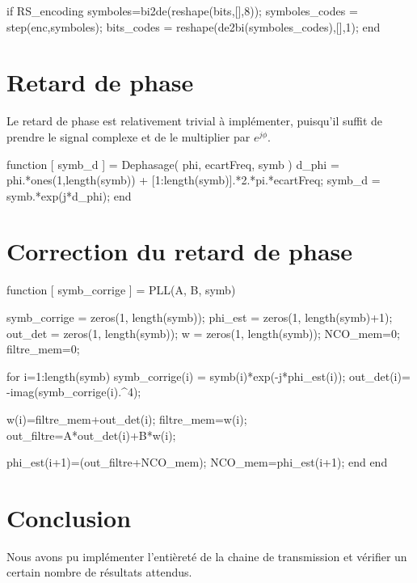\documentclass[a4paper,11pt]{article}
\begin{document}
\begin{lstun}
	if RS_encoding
		symboles=bi2de(reshape(bits,[],8));
		symboles_codes = step(enc,symboles);
		bits_codes = reshape(de2bi(symboles_codes),[],1);
	end
\end{lstun}



\section{Retard de phase}
Le retard de phase est relativement trivial à implémenter, puisqu'il suffit de prendre le signal complexe et de le multiplier par $e^{j \phi}$. 

\begin{lstun}
	function [ symb_d ] = Dephasage( phi, ecartFreq, symb )
	d_phi = phi.*ones(1,length(symb)) + [1:length(symb)].*2.*pi.*ecartFreq;
	symb_d = symb.*exp(j*d_phi);
	end
\end{lstun}

\section{Correction du retard de phase}

\begin{lstun}
	function [ symb_corrige ] = PLL(A, B, symb)
	
	symb_corrige = zeros(1, length(symb));
	phi_est = zeros(1, length(symb)+1);
	out_det = zeros(1, length(symb));
	w = zeros(1, length(symb));
	NCO_mem=0;      %
	filtre_mem=0;   %
	
	for i=1:length(symb)
	symb_corrige(i) = symb(i)*exp(-j*phi_est(i));
	out_det(i)= -imag(symb_corrige(i).^4);
	
	w(i)=filtre_mem+out_det(i); %
	filtre_mem=w(i);            
	out_filtre=A*out_det(i)+B*w(i);   %
	
	phi_est(i+1)=(out_filtre+NCO_mem); %
	NCO_mem=phi_est(i+1);
	end
	end	
\end{lstun}

\section{Conclusion}
Nous avons pu implémenter l'entièreté de la chaine de transmission et vérifier un certain nombre de résultats attendus. 
\end{document}

